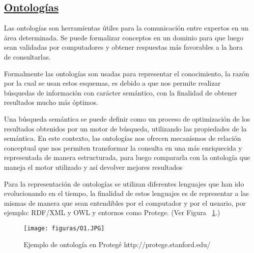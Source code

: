 \documentclass[10pt,conference]{IEEEtran}
\begin{document}
\subsection{\underline{\textbf{Ontologías}}}
 Las ontologías son herramientas útiles para la comunicación entre expertos en un área determinada. Se puede formalizar conceptos en un dominio para que luego sean validadas por computadores y obtener respuestas más favorables a la hora de
consultarlas. \citep{gree} \par
Formalmente las ontologías son usadas para representar el conocimiento, la razón por la cual se usan estos esquemas, es debido a que nos permite realizar búsquedas de información con carácter semántico, con la finalidad de obtener resultados mucho más óptimos. \citep{melgar2011modelo} \par
Una búsqueda semántica se puede definir como un proceso de optimización de los resultados obtenidos por un motor de búsqueda, utilizando las propiedades de la semántica. En este contexto, las ontologías nos ofrecen mecanismos de relación conceptual que nos permiten transformar la consulta en una más enriquecida y representada de manera estructurada, para luego compararla con la ontología que maneja el motor utilizado y así devolver mejores resultados \citep{rujiang2009improving} \par
Para la representación de ontologías se utilizan diferentes lenguajes que han ido evolucionando en el tiempo, la finalidad de estos lenguajes es de representar a las mismas de manera que sean entendibles por el computador y por el usuario, por ejemplo: RDF/XML y OWL y entornos como Protege. (Ver Figura  ~\ref{fO1}.)

\begin{figure}[H]
 \begin{center}
       \texttt{[image: figuras/O1.JPG]}
      \caption{Ejemplo de ontología en Protegé http://protege.stanford.edu/}
      \label{fO1} 
      \end{center}
\end{figure}
\end{document}
